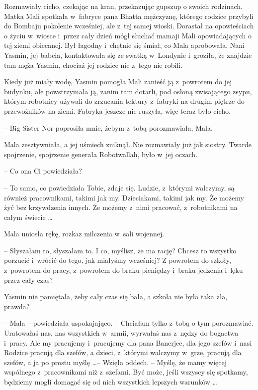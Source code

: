 \documentclass[oneside,polish,11pt,rmheadings]{mwbk}
\begin{document}
Rozmawiały cicho, czekając na kran, przekazując gupszup o swoich rodzinach. Matka Mali spotkała w~fabryce pana Bhatta mężczyznę, którego rodzice przybyli do Bombaju pokolenie wcześniej, ale z~tej samej wioski. Dorastał na opowieściach o życiu w~wiosce i~przez cały dzień mógł słuchać mamaji Mali opowiadających o tej ziemi obiecanej. Był łagodny i~chętnie się śmiał, co Mala aprobowała. Nani Yasmin, jej babcia, kontaktowała się ze swatką w~Londynie i~groziła, że znajdzie tam męża Yasmin, chociaż jej rodzice nic z~tego nie robili.

Kiedy już miały wodę, Yasmin pomogła Mali zanieść ją z~powrotem do jej budynku, ale powstrzymała ją, zanim tam dotarli, pod osłoną zwisającego zsypu, którym robotnicy używali do zrzucania tektury z~fabryki na drugim piętrze do przewoźników na ziemi. Fabryka jeszcze nie ruszyła, więc teraz było cicho.

-- Big Sister Nor poprosiła mnie, żebym z~tobą porozmawiała, Mala.

Mala zesztywniała, a jej uśmiech zniknął. Nie rozmawiały już jak siostry. Twarde spojrzenie, spojrzenie generała Robotwallah, było w~jej oczach. 

-- Co ona Ci powiedziała? 

-- To samo, co powiedziała Tobie, zdaje się. Ludzie, z~którymi walczymy, są również pracownikami, takimi jak my. Dzieciakami, takimi jak my. Że możemy żyć bez krzywdzenia innych. Że możemy z~nimi pracować, z~robotnikami na całym świecie \ldots 

Mala uniosła rękę, rozkaz milczenia w~sali wojennej. 

-- Słyszałam to, słyszałam to. I co, myślisz, że ma rację? Chcesz to wszystko porzucić i~wrócić do tego, jak miałyśmy wcześniej? Z powrotem do szkoły, z~powrotem do pracy, z~powrotem do braku pieniędzy i~braku jedzenia i~lęku przez cały czas?

Yasmin nie pamiętała, żeby cały czas się bała, a szkoła nie była taka zła, prawda? 

-- Mala -- powiedziała uspokajająco. -- Chciałam tylko z~tobą o tym porozmawiać. Uratowałaś nas, nas wszystkich w~armii, wyrwałaś nas z~nędzy do bogactwa i~pracy. Ale my pracujemy i~pracujemy dla pana Banerjee, dla jego szefów i~nasi Rodzice pracują dla szefów, a dzieci, z~którymi walczymy w~grze, pracują dla szefów, a ja po prostu myślę \ldots  -- Wzięła oddech. -- Myślę, że mamy więcej wspólnego z~pracownikami niż z~szefami. Być może, jeśli wszyscy się spotkamy, będziemy mogli domagać się od nich wszystkich lepszych warunków \ldots 
\end{document}
